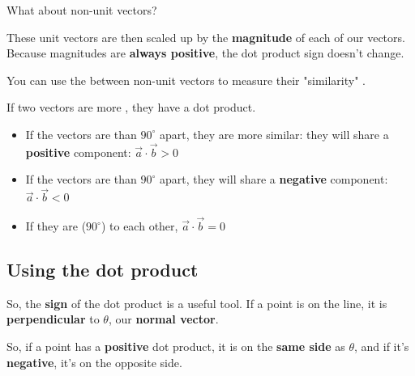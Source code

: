         
        What about non-unit vectors?
        
        These unit vectors are then scaled up by the \textbf{magnitude} of each of our vectors. Because magnitudes are \textbf{always positive}, the dot product sign doesn't change.\\
        
        \begin{concept}
            You can use the  between non-unit vectors to measure their "similarity" . 
            
            If two vectors are more , they have a  dot product. 
            
            \begin{itemize}
                \item If the vectors are  than $90^{\circ}$ apart, they are more similar: they will share a \textbf{positive} component: $\vec{a} \cdot \vec{b} > 0$
                
                \item If the vectors are  than $90^{\circ}$ apart, they will share a \textbf{negative} component: $\vec{a} \cdot \vec{b} < 0$
                
                \item If they are  ($90^{\circ}$) to each other, $\vec{a} \cdot \vec{b} = 0$
            \end{itemize}
        \end{concept}
        
    \subsection*{Using the dot product}
        
        So, the \textbf{sign} of the dot product is a useful tool. If a point is on the line, it is \textbf{perpendicular} to $\theta$, our \textbf{normal vector}.
        
        So, if a point has a \textbf{positive} dot product, it is on the \textbf{same side} as $\theta$, and if it's \textbf{negative}, it's on the opposite side.
        
